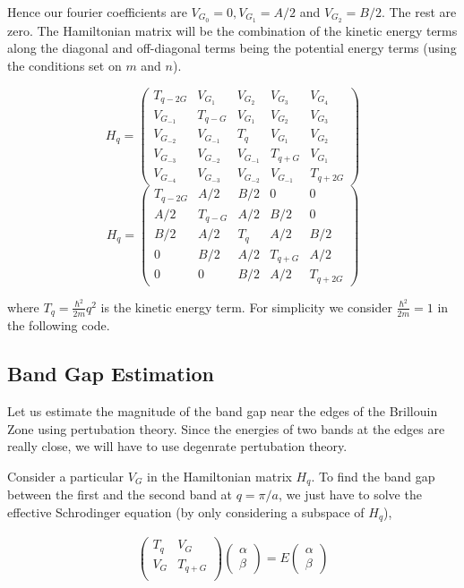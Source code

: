 \documentclass[12pt,a4paper]{article}
\begin{document}
Hence our fourier coefficients are $V_{G_0} = 0, V_{G_1} = A/2$ and $V_{G_2} = B/2$. The rest are zero. The Hamiltonian matrix will be the combination of the kinetic energy terms along the diagonal and off-diagonal terms being the potential energy terms (using the conditions set on $m$ and $n$).

$$H_q = \begin{pmatrix} 
 T_{q-2G} & V_{G_1} & V_{G_2} & V_{G_3} & V_{G_4} \\ 
 V_{G_{-1}} & T_{q-G} & V_{G_1} & V_{G_2} & V_{G_3} \\ 
 V_{G_{-2}} & V_{G_{-1}} & T_{q} & V_{G_1} & V_{G_2} \\ 
 V_{G_{-3}} & V_{G_{-2}} & V_{G_{-1}} & T_{q+G} & V_{G_1}\\ 
 V_{G_{-4}} & V_{G_{-3}} & V_{G_{-2}} & V_{G_{-1}} & T_{q+2G}
\end{pmatrix}$$
$$\boxed{H_q=\begin{pmatrix} 
 T_{q-2G} & A/2 & B/2 & 0 & 0 \\ 
 A/2 & T_{q-G} & A/2 & B/2 & 0\\ 
 B/2 & A/2 & T_{q} &A/2 & B/2 \\ 
 0 & B/2 & A/2 & T_{q+G} & A/2\\
 0 & 0 & B/2 & A/2 & T_{q+2G}
\end{pmatrix}}$$

where $T_q = \frac{\hbar^2}{2m}q^2$ is the kinetic energy term. For simplicity we consider $\frac{\hbar^2}{2m} = 1$ in the following code.
\subsection{Band Gap Estimation} \label{1.3}
Let us estimate the magnitude of the band gap near the edges of the Brillouin Zone using pertubation theory. Since the energies of two bands at the edges are really close, we will have to use degenrate pertubation theory. 

Consider a particular $V_G$ in the Hamiltonian matrix $H_q$. To find the band gap between the first and the second band at $q=\pi/a$, we just have to solve the effective Schrodinger equation (by only considering a subspace of $H_q$),

\begin{align*}
    \begin{pmatrix} 
        T_{q} & V_G \\ 
       V_G & T_{q+G}\\ 
    \end{pmatrix} \begin{pmatrix} 
        \alpha\\ \beta 
    \end{pmatrix} = E \begin{pmatrix} 
        \alpha\\ \beta 
    \end{pmatrix}
\end{align*}
\end{document}
